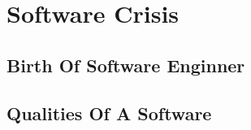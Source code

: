 \section{Software Crisis}
\subsection{Birth Of Software Enginner}
\subsection{Qualities Of A Software}
